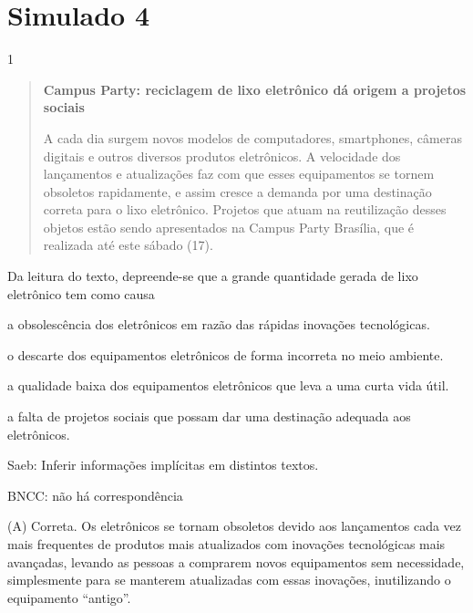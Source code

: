 \section{Simulado 4}

\num{1}

\begin{quote}
\textbf{Campus Party: reciclagem de lixo eletrônico dá origem a projetos
sociais}

A cada dia surgem novos modelos de computadores, smartphones, câmeras
digitais e outros diversos produtos eletrônicos. A velocidade dos
lançamentos e atualizações faz com que esses equipamentos se tornem
obsoletos rapidamente, e assim cresce a demanda por uma destinação
correta para o lixo eletrônico. Projetos que atuam na reutilização
desses objetos estão sendo apresentados na Campus Party Brasília, que é
realizada até este sábado (17).
\end{quote}


Da leitura do texto, depreende-se que a grande quantidade gerada de lixo
eletrônico tem como causa

\begin{escolha}
\item a obsolescência dos eletrônicos em razão das rápidas inovações
tecnológicas.

\item o descarte dos equipamentos eletrônicos de forma incorreta no meio
ambiente.

\item a qualidade baixa dos equipamentos eletrônicos que leva a uma curta
vida útil.

\item a falta de projetos sociais que possam dar uma destinação adequada
aos eletrônicos.
\end{escolha}

Saeb: Inferir informações implícitas em distintos textos.

BNCC: não há correspondência

(A) Correta. Os eletrônicos se tornam obsoletos devido aos lançamentos
cada vez mais frequentes de produtos mais atualizados com inovações
tecnológicas mais avançadas, levando as pessoas a comprarem novos
equipamentos sem necessidade, simplesmente para se manterem atualizadas
com essas inovações, inutilizando o equipamento ``antigo''.

